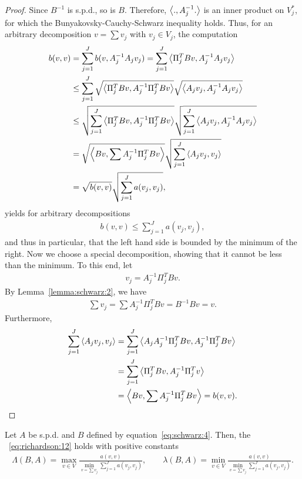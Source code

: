 \begin{proof}
  Since $B^{-1}$ is s.p.d., so is $B$. Therefore, $\scal(.,A_j^{-1}.)$
  is an inner product on $V_j^*$, for which the Bunyakovsky-Cauchy-Schwarz
  inequality holds. Thus, for an arbitrary decomposition $v=\sum v_j$
  with $v_j\in V_j$, the computation
  \begin{align*}
    b(v,v)
    &= \sum_{j=1}^J b(v, A_j^{-1} A_j v_j)
    = \sum_{j=1}^J \scal(\Pi^T_j B v, A_j^{-1} A_j v_j) \\
    &\le \sum_{j=1}^J \sqrt{\scal(\Pi^T_j B v, A_j^{-1}\Pi^T_j B v)}
    \sqrt{\scal(A_j v_j, A_j^{-1}A_j v_j)} \\
    & \le \sqrt{\sum_{j=1}^J \scal(\Pi^T_j B v, A_j^{-1}\Pi^T_j
      B v) }
    \sqrt{\sum_{j=1}^J \scal(A_j v_j,A_j^{-1}A_j v_j)} \\
    &= \sqrt{\scal(B v, {\sum A_j^{-1}\Pi^T_j} B v)}
    \sqrt{\sum_{j=1}^J \scal(A_j v_j, v_j)} \\
    &= \sqrt{b(v,v)} \sqrt{\sum_{j=1}^J a(v_j, v_j)},
  \end{align*}
  yields for arbitrary decompositions
  \begin{gather}
    \label{eq:schwarz:17}
    b(v,v) \le \sum_{j=1}^J a(v_j, v_j),
  \end{gather}
  and thus in particular, that the left hand side is bounded by the
  minimum of the right. Now we choose a special decomposition, showing
  that it cannot be less than the minimum. To this end, let
  \begin{gather}
    \label{eq:schwarz:18}
    v_j = A_j^{-1} \Pi^T_j B v.
  \end{gather}
  By Lemma~\ref{lemma:schwarz:2}, we have
  \begin{gather*}
    \sum v_j = \sum A_j^{-1} \Pi^T_j B v = B^{-1} B v = v.
  \end{gather*}
  Furthermore,
  \begin{align*}
    \sum_{j=1}^J \scal(A_j v_j, v_j)
    &= \sum_{j=1}^J \scal(A_j A_j^{-1} \Pi^T_j B v, A_j^{-1} \Pi^T_j
    B v) \\
    &= \sum_{j=1}^J \scal(\Pi^T_j B v, A_j^{-1} \Pi^T_j v) \\
    &= \scal(B v, \sum A_j^{-1} \Pi^T_j B v) = b(v, v).
  \end{align*}
\end{proof}

\begin{theorem}
  \label{theorem:schwarz:1}
  Let $A$ be s.p.d. and $B$ defined by
  equation~\eqref{eq:schwarz:4}. Then, the ~\eqref{eq:richardson:12} holds with
  positive constants
  \begin{gather}
    \label{eq:schwarz:19}
    \Lambda(B,A) = \max_{v\in V} \frac{a(v,v)}{\min\limits_{v=\sum v_j}
      \sum\limits_{j=1}^J a(v_j, v_j)}
    ,\qquad
    \lambda(B,A) = \min\limits_{v\in V} \frac{a(v,v)}{\min\limits_{v=\sum v_j}
      \sum\limits_{j=1}^J a(v_j, v_j)}.
  \end{gather}
\end{theorem}

